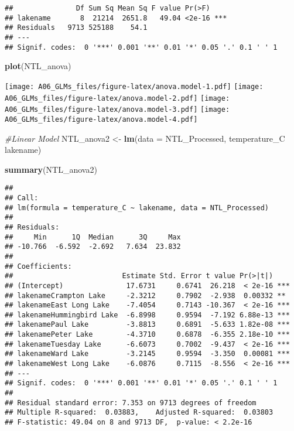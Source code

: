 \documentclass[
]{article}
\newenvironment{Shaded}{\begin{snugshade}}{\end{snugshade}}
\newcommand{\CommentTok}[1]{\textcolor[rgb]{0.56,0.35,0.01}{\textit{#1}}}
\newcommand{\DataTypeTok}[1]{\textcolor[rgb]{0.13,0.29,0.53}{#1}}
\newcommand{\KeywordTok}[1]{\textcolor[rgb]{0.13,0.29,0.53}{\textbf{#1}}}
\newcommand{\NormalTok}[1]{#1}
\newcommand{\OperatorTok}[1]{\textcolor[rgb]{0.81,0.36,0.00}{\textbf{#1}}}
\newcommand{\StringTok}[1]{\textcolor[rgb]{0.31,0.60,0.02}{#1}}
\begin{document}
\begin{verbatim}
##               Df Sum Sq Mean Sq F value Pr(>F)    
## lakename       8  21214  2651.8   49.04 <2e-16 ***
## Residuals   9713 525188    54.1                   
## ---
## Signif. codes:  0 '***' 0.001 '**' 0.01 '*' 0.05 '.' 0.1 ' ' 1
\end{verbatim}

\begin{Shaded}
\begin{Highlighting}[]
\KeywordTok{plot}\NormalTok{(NTL_anova)}
\end{Highlighting}
\end{Shaded}

\texttt{[image: A06\_GLMs\_files/figure-latex/anova.model-1.pdf]}
\texttt{[image: A06\_GLMs\_files/figure-latex/anova.model-2.pdf]}
\texttt{[image: A06\_GLMs\_files/figure-latex/anova.model-3.pdf]}
\texttt{[image: A06\_GLMs\_files/figure-latex/anova.model-4.pdf]}

\begin{Shaded}
\begin{Highlighting}[]
\CommentTok{#Linear Model}
\NormalTok{NTL_anova2 <-}\StringTok{ }\KeywordTok{lm}\NormalTok{(}\DataTypeTok{data =}\NormalTok{ NTL_Processed, temperature_C }\OperatorTok{~}\StringTok{ }\NormalTok{lakename)}

\KeywordTok{summary}\NormalTok{(NTL_anova2)}
\end{Highlighting}
\end{Shaded}

\begin{verbatim}
## 
## Call:
## lm(formula = temperature_C ~ lakename, data = NTL_Processed)
## 
## Residuals:
##     Min      1Q  Median      3Q     Max 
## -10.766  -6.592  -2.692   7.634  23.832 
## 
## Coefficients:
##                          Estimate Std. Error t value Pr(>|t|)    
## (Intercept)               17.6731     0.6741  26.218  < 2e-16 ***
## lakenameCrampton Lake     -2.3212     0.7902  -2.938  0.00332 ** 
## lakenameEast Long Lake    -7.4054     0.7143 -10.367  < 2e-16 ***
## lakenameHummingbird Lake  -6.8998     0.9594  -7.192 6.88e-13 ***
## lakenamePaul Lake         -3.8813     0.6891  -5.633 1.82e-08 ***
## lakenamePeter Lake        -4.3710     0.6878  -6.355 2.18e-10 ***
## lakenameTuesday Lake      -6.6073     0.7002  -9.437  < 2e-16 ***
## lakenameWard Lake         -3.2145     0.9594  -3.350  0.00081 ***
## lakenameWest Long Lake    -6.0876     0.7115  -8.556  < 2e-16 ***
## ---
## Signif. codes:  0 '***' 0.001 '**' 0.01 '*' 0.05 '.' 0.1 ' ' 1
## 
## Residual standard error: 7.353 on 9713 degrees of freedom
## Multiple R-squared:  0.03883,    Adjusted R-squared:  0.03803 
## F-statistic: 49.04 on 8 and 9713 DF,  p-value: < 2.2e-16
\end{verbatim}
\end{document}
